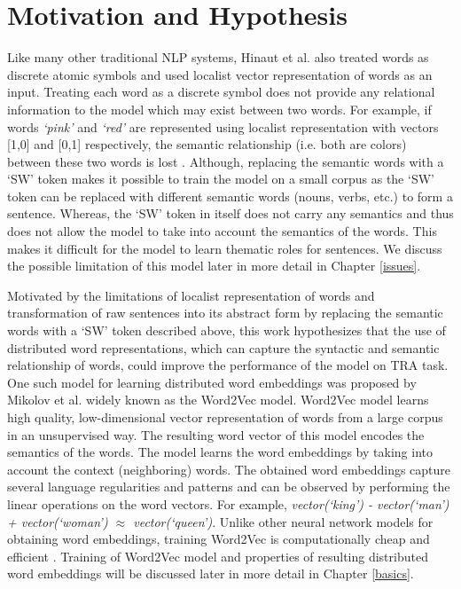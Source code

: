 \section{Motivation and Hypothesis}

Like many other traditional NLP systems, Hinaut et al. \cite{xavier:2013:RT} also treated words as discrete atomic symbols and used localist vector representation of words as an input. Treating each word as a discrete symbol does not provide any relational information to the model which may exist between two words. For example, if words \textit{`pink'} and \textit{`red'} are represented using localist representation with vectors [1,0] and [0,1] respectively, the semantic relationship (i.e. both are colors) between these two words is lost \cite{w2v:tensor_flow}. Although, replacing the semantic words with a `SW' token makes it possible to train the model on a small corpus as the `SW' token can be replaced with different semantic words (nouns, verbs, etc.) to form a sentence. Whereas, the `SW' token in itself does not carry any semantics and thus does not allow the model to take into account the semantics of the words. This makes it difficult for the model to learn thematic roles for sentences. We discuss the possible limitation of this model later in more detail in Chapter \ref{issues}.

Motivated by the limitations of localist representation of words and transformation of raw sentences into its abstract form by replacing the semantic words with a `SW' token described above, this work hypothesizes that the use of distributed word representations, which can capture the syntactic and semantic relationship of words, could improve the performance of the model on TRA task. One such model for learning distributed word embeddings was proposed by Mikolov et al. \cite{w2v:mikolov_2013_distributed} widely known as the Word2Vec model. Word2Vec model learns high quality, low-dimensional vector representation of words from a large corpus in an unsupervised way. The resulting word vector of this model encodes the semantics of the words. The model learns the word embeddings by taking into account the context (neighboring) words. The obtained word embeddings capture several language regularities and patterns \cite{w2v:language_similarities, w2v:mikolov_2013_distributed} and can be observed by performing the linear operations on the word vectors. For example, \textit{vector(`king') - vector(`man') + vector(`woman') $\approx$ vector(`queen')}. Unlike other neural network models \cite{w2v:glove, srl:collobert:2008, word_vec:turian:2010, word_vec:hinton:2009} for obtaining word embeddings, training Word2Vec is computationally cheap and efficient \cite{w2v:mikolov_2013_distributed}. Training of Word2Vec model and properties of resulting distributed word embeddings will be discussed later in more detail in Chapter \ref{basics}.  

